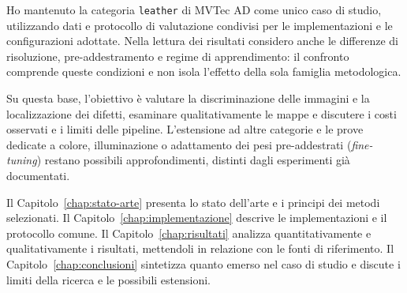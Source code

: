 Ho mantenuto la categoria \texttt{leather} di MVTec AD come unico caso di studio, utilizzando dati e protocollo di valutazione condivisi per le implementazioni e le configurazioni adottate. Nella lettura dei risultati considero anche le differenze di risoluzione, pre-addestramento e regime di apprendimento: il confronto comprende queste condizioni e non isola l'effetto della sola famiglia metodologica.

Su questa base, l'obiettivo è valutare la discriminazione delle immagini e la localizzazione dei difetti, esaminare qualitativamente le mappe e discutere i costi osservati e i limiti delle pipeline. L'estensione ad altre categorie e le prove dedicate a colore, illuminazione o adattamento dei pesi pre-addestrati (\textit{fine-tuning}) restano possibili approfondimenti, distinti dagli esperimenti già documentati.

Il Capitolo~\ref{chap:stato-arte} presenta lo stato dell'arte e i principi dei metodi selezionati. Il Capitolo~\ref{chap:implementazione} descrive le implementazioni e il protocollo comune. Il Capitolo~\ref{chap:risultati} analizza quantitativamente e qualitativamente i risultati, mettendoli in relazione con le fonti di riferimento. Il Capitolo~\ref{chap:conclusioni} sintetizza quanto emerso nel caso di studio e discute i limiti della ricerca e le possibili estensioni.
